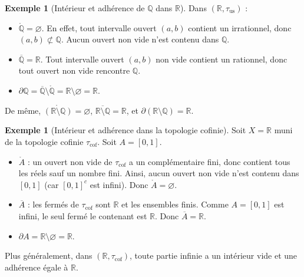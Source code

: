 \documentclass[12pt,a4paper,openany]{book}
\theoremstyle{definition}
\theoremstyle{cours}
\theoremstyle{coursnormal}
\newtheorem{exemple}[theoreme]{Exemple}
\newcommand{\Q}{\mathbb{Q}}
\newcommand{\R}{\mathbb{R}}
\newcommand{\Int}[1]{\mathring{#1}}
\newcommand{\Cl}[1]{\overline{#1}}
\newcommand{\Fr}[1]{\partial #1}
\begin{document}
\begin{exemple}[Intérieur et adhérence de $\Q$ dans $\R$]\label{ex:int-cl-Q}
  Dans $(\R, \tau_{\mathrm{us}})$ :
  \begin{itemize}
    \item $\Int{\Q} = \varnothing$. En effet, tout intervalle ouvert $(a,b)$ contient un irrationnel, donc $(a,b) \not\subset \Q$. Aucun ouvert non vide n'est contenu dans $\Q$.
    \item $\Cl{\Q} = \R$. Tout intervalle ouvert $(a,b)$ non vide contient un rationnel, donc tout ouvert non vide rencontre $\Q$.
    \item $\Fr{\Q} = \Cl{\Q} \setminus \Int{\Q} = \R \setminus \varnothing = \R$.
  \end{itemize}
  De même, $\Int{(\R \setminus \Q)} = \varnothing$, $\Cl{\R \setminus \Q} = \R$, et $\Fr{(\R \setminus \Q)} = \R$.
\end{exemple}

\begin{exemple}[Intérieur et adhérence dans la topologie cofinie]\label{ex:int-cl-cofinie}
  Soit $X = \R$ muni de la topologie cofinie $\tau_{\mathrm{cof}}$. Soit $A = [0,1]$.
  \begin{itemize}
    \item $\Int{A}$ : un ouvert non vide de $\tau_{\mathrm{cof}}$ a un complémentaire fini, donc contient tous les réels sauf un nombre fini. Ainsi, aucun ouvert non vide n'est contenu dans $[0,1]$ (car $[0,1]^c$ est infini). Donc $\Int{A} = \varnothing$.
    \item $\Cl{A}$ : les fermés de $\tau_{\mathrm{cof}}$ sont $\R$ et les ensembles finis. Comme $A = [0,1]$ est infini, le seul fermé le contenant est $\R$. Donc $\Cl{A} = \R$.
    \item $\Fr{A} = \R \setminus \varnothing = \R$.
  \end{itemize}
  Plus généralement, dans $(\R, \tau_{\mathrm{cof}})$, toute partie infinie a un intérieur vide et une adhérence égale à $\R$.
\end{exemple}
\end{document}
